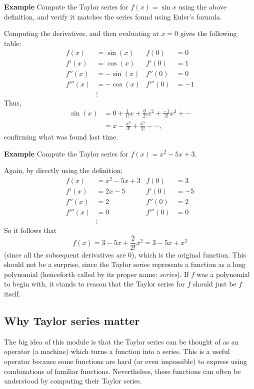 \documentclass[twoside,openright,titlepage,a4paper]{book}
\begin{document}
\begin{sloppypar}
\textbf{Example} Compute the Taylor series for ${f(x)=\sin x}$ using the above definition, and verify it matches the series found using Euler's formula.
\begin{examplebox}
Computing the derivatives, and then evaluating at ${x=0}$ gives the following table:
\begin{align*}
f(x) &= \sin(x) & f(0) &= 0 \\
f'(x) &= \cos(x) & f'(0) &= 1 \\
f''(x) &= -\sin(x) & f''(0) &= 0 \\
f'''(x) &= -\cos(x) & f'''(0) &= -1 \\
& \vdots 
\end{align*}
Thus,
\begin{align*}
\sin(x) &= 0+\frac{1}{1!}x+\frac{0}{2!}x^2+\frac{-1}{3!}x^3+\dotsb \\
&= x - \frac{x^3}{3!} + \frac{x^5}{5!} - \dotsb,
\end{align*}
confirming what was found last time.
\end{examplebox}

\textbf{Example} Compute the Taylor series for ${f(x) = x^2-5x+3}$.
\begin{examplebox}
Again, by directly using the definition:
\begin{align*}
f(x) &= x^2-5x+3 & f(0) &= 3 \\
f'(x) &= 2x-5 & f'(0) &= -5 \\
f''(x) &= 2 & f''(0) &= 2 \\
f'''(x) &= 0 & f'''(0) &= 0 \\
& \vdots
\end{align*}
So it follows that \[f(x)=3-5x+\frac{2}{2!}x^2=3-5x+x^2\]
(since all the subsequent derivatives are 0), which is the original function. This should not be a surprise, since the Taylor series represents a function as a long polynomial (henceforth called by its proper name: \textit{series}). If $f$ was a polynomial to begin with, it stands to reason that the Taylor series for $f$ should just be $f$ itself.
\end{examplebox}

\subsection{Why Taylor series matter}
The big idea of this module is that the Taylor series can be thought of as an operator (a machine) which turns a function into a series. This is a useful operator because some functions are hard (or even impossible) to express using combinations of familiar functions. Nevertheless, these functions can often be understood by computing their Taylor series.


\end{sloppypar}
\end{document}
